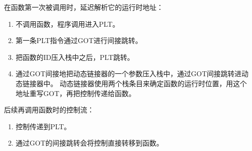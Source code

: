 {{        在函数第一次被调用时，延迟解析它的运行时地址：

        \begin{enumerate}
            \item 不调用函数，程序调用进入PLT。
            \item 第一条PLT指令通过GOT进行间接跳转。
            \item 把函数的ID压入栈中之后，PLT跳转。
            \item
            {
                通过GOT间接地把动态链接器的一个参数压入栈中，通过GOT间接跳转进动态链接器中。
                动态链接器使用两个栈条目来确定函数的运行时位置，用这个地址重写GOT，再把控制传递给函数。
            }
        \end{enumerate}

        后续再调用函数时的控制流：

        \begin{enumerate}
            \item 控制传递到PLT。
            \item 通过GOT的间接跳转会将控制直接转移到函数。
        \end{enumerate}
    }
}
